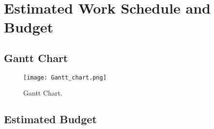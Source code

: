 \section{Estimated Work Schedule and Budget}




\subsection{Gantt Chart}
\FloatBarrier 
\begin{figure}[!htbp]
	\centering
		\texttt{[image: Gantt\_chart.png]}
	\caption{Gantt Chart.}
	\label{fig:exampletc}
\end{figure}

\clearpage  %

\subsection{Estimated Budget}

\FloatBarrier  %

